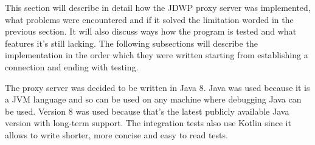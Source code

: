 \documentclass[..thesis.tex]{subfiles}
\begin{document}
This section will describe in detail how the JDWP proxy server was implemented, what problems were encountered and if it solved the limitation worded in the previous section.
It will also discuss ways how the program is tested and what features it's still lacking.
The following subsections will describe the implementation in the order which they were written starting from establishing a connection and ending with testing.

The proxy server was decided to be written in Java 8.
Java was used because it is a JVM language and so can be used on any machine where debugging Java can be used.
Version 8 was used because that's the latest publicly available Java version with long-term support.
The integration tests also use Kotlin since it allows to write shorter, more concise and easy to read tests.
\end{document}
